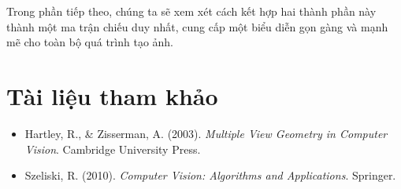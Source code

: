 Trong phần tiếp theo, chúng ta sẽ xem xét cách kết hợp hai thành phần này thành một ma trận chiếu duy nhất, cung cấp một biểu diễn gọn gàng và mạnh mẽ cho toàn bộ quá trình tạo ảnh.

\section*{Tài liệu tham khảo}
\begin{itemize}
	\item[1] Hartley, R., \& Zisserman, A. (2003). \textit{Multiple View Geometry in Computer Vision}. Cambridge University Press.
	\item[2] Szeliski, R. (2010). \textit{Computer Vision: Algorithms and Applications}. Springer.
\end{itemize}